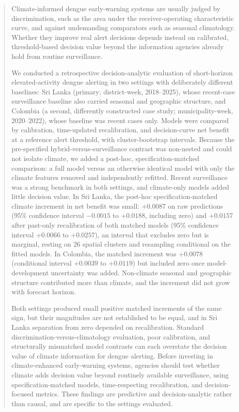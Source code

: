 \documentclass[11pt,a4paper]{article}
\begin{document}
\begin{abstract}
\noindent Climate-informed dengue early-warning systems are usually judged by discrimination, such as the area under the receiver-operating characteristic curve, and against undemanding comparators such as seasonal climatology. Whether they improve real alert decisions depends instead on calibrated, threshold-based decision value beyond the information agencies already hold from routine surveillance.

\noindent We conducted a retrospective decision-analytic evaluation of short-horizon elevated-activity dengue alerting in two settings with deliberately different baselines: Sri Lanka (primary; district-week, 2018--2025), whose recent-case surveillance baseline also carried seasonal and geographic structure, and Colombia (a second, differently constructed case study; municipality-week, 2020--2022), whose baseline was recent cases only. Models were compared by calibration, time-updated recalibration, and decision-curve net benefit at a reference alert threshold, with cluster-bootstrap intervals. Because the pre-specified hybrid-versus-surveillance contrast was non-nested and could not isolate climate, we added a post-hoc, specification-matched comparison: a full model versus an otherwise identical model with only the climate features removed and independently refitted. Recent surveillance was a strong benchmark in both settings, and climate-only models added little decision value. In Sri Lanka, the post-hoc specification-matched climate increment in net benefit was small: $+0.0087$ on raw predictions (95\% confidence interval $-0.0015$ to $+0.0188$, including zero) and $+0.0157$ after past-only recalibration of both matched models (95\% confidence interval $+0.0066$ to $+0.0257$), an interval that excludes zero but is marginal, resting on 26 spatial clusters and resampling conditional on the fitted models. In Colombia, the matched increment was $+0.0078$ (conditional interval $+0.0039$ to $+0.0119$) but included zero once model-development uncertainty was added. Non-climate seasonal and geographic structure contributed more than climate, and the increment did not grow with forecast horizon.

\noindent Both settings produced small positive matched increments of the same sign, but their magnitudes are not established to be equal, and in Sri Lanka separation from zero depended on recalibration. Standard discrimination-versus-climatology evaluation, poor calibration, and structurally mismatched model contrasts can each overstate the decision value of climate information for dengue alerting. Before investing in climate-enhanced early-warning systems, agencies should test whether climate adds decision value beyond routinely available surveillance, using specification-matched models, time-respecting recalibration, and decision-focused metrics. These findings are predictive and decision-analytic rather than causal, and are specific to the settings evaluated.
\end{abstract}
\end{document}
